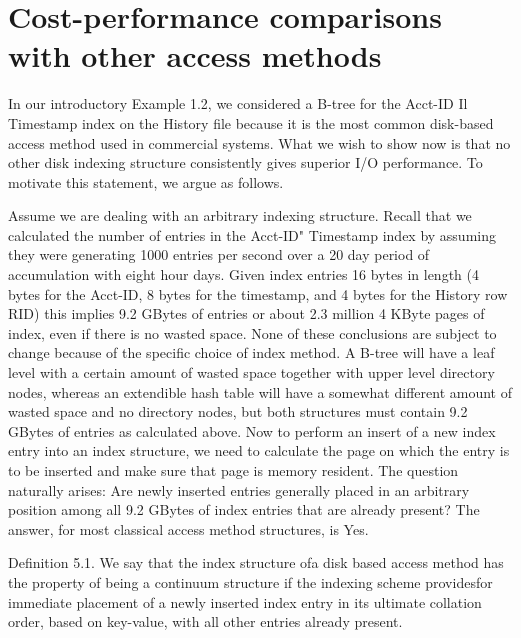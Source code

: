 \documentclass[a4paper,11pt,notitlepage,twoside,openright]{article}
\begin{document}
\hypertarget{cost-performance-comparisons-with-other-access-methods}{%
\section{Cost-performance comparisons with other access
methods}\label{cost-performance-comparisons-with-other-access-methods}}


In our introductory Example 1.2, we considered a B-tree for the Acct-ID
Il Timestamp index on the History file because it is the most common
disk-based access method used in commercial systems. What we wish to
show now is that no other disk indexing structure consistently gives
superior I/O performance. To motivate this statement, we argue as
follows.

Assume we are dealing with an arbitrary indexing structure. Recall that
we calculated the number of entries in the Acct-ID" Timestamp index by
assuming they were generating 1000 entries per second over a 20 day
period of accumulation with eight hour days. Given index entries 16
bytes in length (4 bytes for the Acct-ID, 8 bytes for the timestamp, and
4 bytes for the History row RID) this implies 9.2 GBytes of entries or
about 2.3 million 4 KByte pages of index, even if there is no wasted
space. None of these conclusions are subject to change because of the
specific choice of index method. A B-tree will have a leaf level with a
certain amount of wasted space together with upper level directory
nodes, whereas an extendible hash table will have a somewhat different
amount of wasted space and no directory nodes, but both structures must
contain 9.2 GBytes of entries as calculated above. Now to perform an
insert of a new index entry into an index structure, we need to
calculate the page on which the entry is to be inserted and make sure
that page is memory resident. The question naturally arises: Are newly
inserted entries generally placed in an arbitrary position among all 9.2
GBytes of index entries that are already present? The answer, for most
classical access method structures, is Yes.

Definition 5.1. We say that the index structure ofa disk based access
method has the property of being a continuum structure if the indexing
scheme providesfor immediate placement of a newly inserted index entry
in its ultimate collation order, based on key-value, with all other
entries already present.
\end{document}
